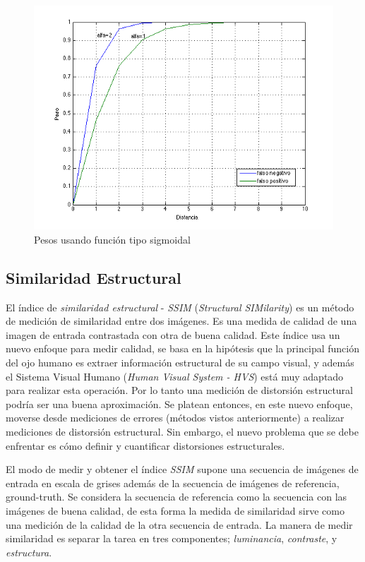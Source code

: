 \begin{figure}[!ht]
\centering
\includegraphics[scale=0.4]{img/sigmoid_function}
\caption{Pesos usando función tipo sigmoidal}
\label{fig:Pesos tipo sigmoidal}
\end{figure}


\subsection{Similaridad Estructural}
El índice de \emph{similaridad estructural} - \emph{SSIM} (\emph{Structural SIMilarity}) \cite{park_benchmark_2013} \cite{wang_image_2004} es un método de medición de similaridad entre dos imágenes. Es una medida de calidad de una imagen de entrada contrastada con otra de buena calidad. Este índice usa un nuevo enfoque para medir calidad, se basa en la hipótesis que la principal función del ojo humano  es extraer información estructural de su campo visual, y además el Sistema Visual Humano (\emph{Human Visual System - HVS}) está muy adaptado para realizar esta operación. Por lo tanto una medición de distorsión estructural podría ser una buena aproximación. Se platean entonces, en este nuevo enfoque, moverse desde mediciones de errores (métodos vistos anteriormente) a realizar mediciones de distorsión estructural. Sin embargo, el nuevo problema que se debe enfrentar es cómo definir y cuantificar distorsiones estructurales.

El modo de medir y obtener el índice \emph{SSIM} supone una secuencia de imágenes de entrada en escala de grises además de la secuencia de imágenes de referencia, ground-truth. Se considera la secuencia de referencia como la secuencia con las imágenes de buena calidad, de esta forma la medida de similaridad sirve como una medición de la calidad de la otra secuencia de entrada. La manera de medir similaridad es separar la tarea en tres componentes; \emph{luminancia}, \emph{contraste}, y \emph{estructura}.

